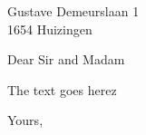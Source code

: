 \documentclass{letter}
\begin{document}
 
    \begin{letter}{Gustave Demeurslaan 1\\1654 Huizingen}
    
        \opening{Dear Sir and Madam}

        The text goes herez

        \closing{Yours,}

    \end{letter} 
\end{document}
